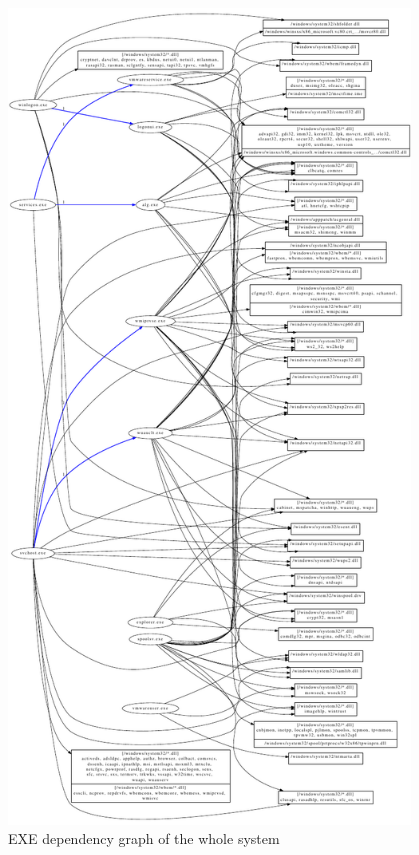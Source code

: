 \begin{figure}[htbp]
\centering
\includegraphics[keepaspectratio,width=0.95\textwidth,height=0.95\textheight]{depvis/boot-gdll.pdf}
\caption{EXE dependency graph of the whole system}
\label{fig:boot}
\end{figure}

